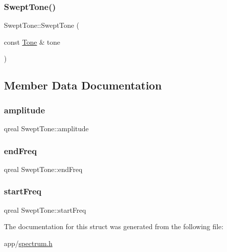 \hypertarget{struct_swept_tone_a79a1bcd511e7fc9b847603c4cefaa03c}{}\label{struct_swept_tone_a79a1bcd511e7fc9b847603c4cefaa03c} 
\subsubsection{\texorpdfstring{Swept\+Tone()}{SweptTone()}\hspace{0.1cm}{\footnotesize\ttfamily [2/2]}}
{\footnotesize\ttfamily Swept\+Tone\+::\+Swept\+Tone (\begin{DoxyParamCaption}\item[{const \hyperlink{struct_tone}{Tone} \&}]{tone }\end{DoxyParamCaption})\hspace{0.3cm}{\ttfamily [inline]}}



\subsection{Member Data Documentation}
\hypertarget{struct_swept_tone_a335b714b2688aa70154b736662b95d09}{}\label{struct_swept_tone_a335b714b2688aa70154b736662b95d09} 
\subsubsection{\texorpdfstring{amplitude}{amplitude}}
{\footnotesize\ttfamily qreal Swept\+Tone\+::amplitude}

\hypertarget{struct_swept_tone_abad3f34970552d406721eb8c051911e5}{}\label{struct_swept_tone_abad3f34970552d406721eb8c051911e5} 
\subsubsection{\texorpdfstring{end\+Freq}{endFreq}}
{\footnotesize\ttfamily qreal Swept\+Tone\+::end\+Freq}

\hypertarget{struct_swept_tone_acfccd7b4e61255b6061bb8151067db79}{}\label{struct_swept_tone_acfccd7b4e61255b6061bb8151067db79} 
\subsubsection{\texorpdfstring{start\+Freq}{startFreq}}
{\footnotesize\ttfamily qreal Swept\+Tone\+::start\+Freq}



The documentation for this struct was generated from the following file\+:\begin{DoxyCompactItemize}
\item 
app/\hyperlink{spectrum_8h}{spectrum.\+h}\end{DoxyCompactItemize}
